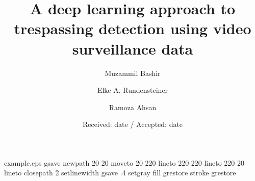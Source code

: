 %
%
%
%
%
\begin{filecontents*}{example.eps}
gsave
newpath
  20 20 moveto
  20 220 lineto
  220 220 lineto
  220 20 lineto
closepath
2 setlinewidth
gsave
  .4 setgray fill
grestore
stroke
grestore
\end{filecontents*}
%
\RequirePackage{fix-cm}
%
\documentclass[twocolumn]{svjour3}          %
\smartqed  %

\usepackage{graphicx}
\usepackage{lineno}
\usepackage{color}
\usepackage{amsmath}
\usepackage{comment}




\title{A deep learning approach to trespassing detection using video surveillance data
}

\author{Muzammil Bashir \and
Elke A. Rundensteiner \and
Ramoza Ahsan}



\date{Received: date / Accepted: date}

\maketitle
















